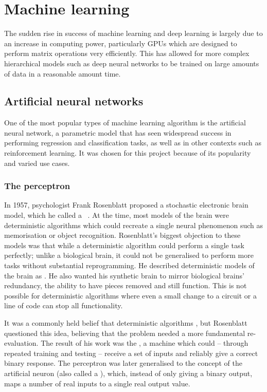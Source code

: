 
\chapter{Machine learning}

The sudden rise in success of machine learning and deep learning is largely due to an increase in computing power, particularly \acp{GPU} which are designed to perform matrix operations very efficiently.
This has allowed for more complex hierarchical models such as deep neural networks to be trained on large amounts of data in a reasonable amount time.

\section{Artificial neural networks}

One of the most popular types of machine learning algorithm is the artificial neural network, a parametric model that has seen widespread success in performing regression and classification tasks, as well as in other contexts such as reinforcement learning.
It was chosen for this project because of its popularity and varied use cases.

\subsection{The perceptron}

In 1957, psychologist Frank Rosenblatt proposed a stochastic electronic brain model, which he called a ~\autocite{rosenblatt1957}.
At the time, most models of the brain were deterministic algorithms which could recreate a single neural phenomenon such as memorisation or object recognition.
Rosenblatt's biggest objection to these models was that while a deterministic algorithm could perform a single task perfectly; unlike a biological brain, it could not be generalised to perform more tasks without substantial reprogramming.
He described deterministic models of the brain as .
He also wanted his synthetic brain to mirror biological brains' redundancy, the ability to have pieces removed and still function.
This is not possible for deterministic algorithms where even a small change to a circuit or a line of code can stop all functionality.

It was a commonly held belief that deterministic algorithms , but Rosenblatt questioned this idea, believing that the problem needed a more fundamental re-evaluation.
The result of his work was the , a machine which could -- through repeated training and testing -- receive a set of inputs and reliably give a correct binary response.
The perceptron was later generalised to the concept of the artificial neuron (also called a ), which, instead of only giving a binary output, maps a number of real inputs to a single real output value.


